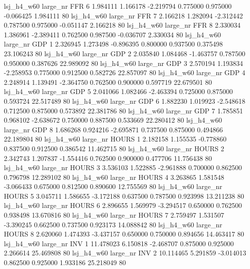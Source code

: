   lsj_h4_w60   large_nr      FFR                 6  1.984111  1.166178  -2.219794 0.775000 0.975000 -0.066425    1.984111 80
  lsj_h4_w60   large_nr      FFR                 7  2.166218  1.282094  -2.312442 0.787500 0.975000 -0.051147    2.166218 80
  lsj_h4_w60   large_nr      FFR                 8  2.330034  1.386961  -2.389411 0.762500 0.987500 -0.036707    2.330034 80
  lsj_h4_w60   large_nr      GDP                 1  2.326945  1.273498  -0.896395 0.800000 0.937500  0.375498   23.106243 80
  lsj_h4_w60   large_nr      GDP                 2  2.035840  1.084468  -1.463757 0.787500 0.950000  0.387626   22.989092 80
  lsj_h4_w60   large_nr      GDP                 3  2.570194  1.193834  -2.258953 0.775000 0.912500  0.582726   22.857097 80
  lsj_h4_w60   large_nr      GDP                 4  2.248914  1.139491  -2.364750 0.762500 0.900000  0.597719   22.679501 80
  lsj_h4_w60   large_nr      GDP                 5  2.041066  1.082466  -2.463394 0.725000 0.875000  0.593724   22.517489 80
  lsj_h4_w60   large_nr      GDP                 6  1.882230  1.019923  -2.548618 0.712500 0.875000  0.573892   22.381786 80
  lsj_h4_w60   large_nr      GDP                 7  1.785851  0.968102  -2.638672 0.750000 0.887500  0.533669   22.280412 80
  lsj_h4_w60   large_nr      GDP                 8  1.686268  0.924216  -2.695871 0.737500 0.875000  0.494866   22.189804 80
  lsj_h4_w60   large_nr    HOURS                 1  2.182158  1.155535  -0.778860 0.837500 0.912500  0.386542   11.462715 80
  lsj_h4_w60   large_nr    HOURS                 2  2.342743  1.207837  -1.554416 0.762500 0.900000  0.477706   11.756438 80
  lsj_h4_w60   large_nr    HOURS                 3  3.536103  1.522885  -2.961888 0.700000 0.862500  0.796798   12.289102 80
  lsj_h4_w60   large_nr    HOURS                 4  3.263865  1.581548  -3.066433 0.675000 0.812500  0.890600   12.755569 80
  lsj_h4_w60   large_nr    HOURS                 5  3.045711  1.586655  -3.172188 0.637500 0.787500  0.923998   13.211238 80
  lsj_h4_w60   large_nr    HOURS                 6  2.896655  1.569979  -3.294517 0.650000 0.762500  0.938498   13.670816 80
  lsj_h4_w60   large_nr    HOURS                 7  2.759497  1.531507  -3.390245 0.662500 0.737500  0.923173   14.088842 80
  lsj_h4_w60   large_nr    HOURS                 8  2.620060  1.474393  -3.437157 0.650000 0.750000  0.894656   14.463417 80
  lsj_h4_w60   large_nr      INV                 1 11.478023  6.150818  -2.468707 0.875000 0.925000  2.266614   25.469808 80
  lsj_h4_w60   large_nr      INV                 2 10.114465  5.291859  -3.014013 0.862500 0.925000  1.933186   25.218049 80
